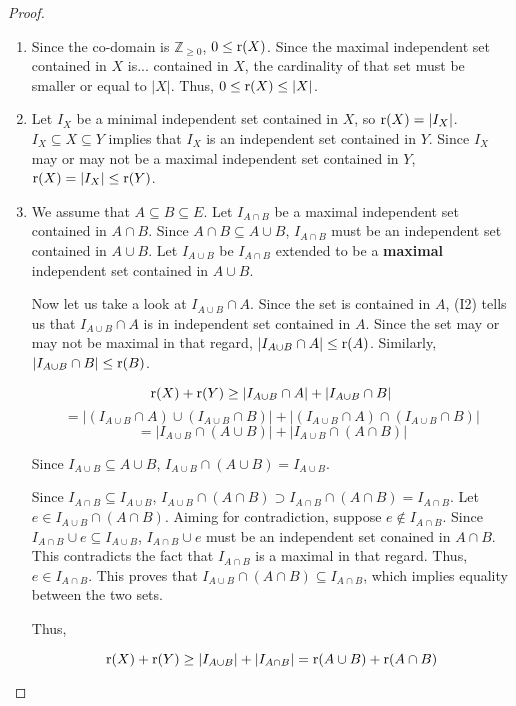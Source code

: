 \begin{proof}
    \,
    \begin{enumerate}
        \item Since the co-domain is $\mathbb{Z}_{\geq0}$, $0\leq\operatorname{r}(X)$. Since the maximal independent set contained in $X$ is... contained in $X$, the cardinality of that set must be smaller or equal to $|X|$. Thus, $0\leq\operatorname{r}(X)\leq|X|$.
        \item Let $I_X$ be a minimal independent set contained in $X$, so $\operatorname{r}(X)=|I_X|$. $I_X\subseteq X\subseteq Y$ implies that $I_X$ is an independent set contained in $Y$. Since $I_X$ may or may not be a maximal independent set contained in $Y$, $\operatorname{r}(X)=|I_X|\leq\operatorname{r}(Y)$. 
        \item We assume that $A\subseteq B\subseteq E$. Let $I_{A\cap B}$ be a maximal independent set contained in $A\cap B$. Since $A\cap B\subseteq A\cup B$, $I_{A\cap B}$ must be an independent set contained in $A\cup B$. Let $I_{A\cup B}$ be $I_{A\cap B}$ extended to be a \textbf{maximal} independent set contained in $A\cup B$. 
        
        Now let us take a look at $I_{A\cup B}\cap A$. Since the set is contained in $A$, (I2) tells us that $I_{A\cup B}\cap A$ is in independent set contained in $A$. Since the set may or may not be maximal in that regard, $|I_{A\cup B}\cap A|\leq \operatorname{r}(A)$. Similarly, $|I_{A\cup B}\cap B|\leq \operatorname{r}(B) $.
        
        $$ \operatorname{r}(X)+\operatorname{r}(Y) \geq |I_{A\cup B}\cap A|+|I_{A\cup B}\cap B| $$
        $$ = |(I_{A\cup B}\cap A)\cup(I_{A\cup B}\cap B)|+|(I_{A\cup B}\cap A)\cap(I_{A\cup B}\cap B)| $$
        $$ = |I_{A\cup B}\cap (A\cup B)|+|I_{A\cup B}\cap (A\cap B)| $$

        Since $I_{A\cup B}\subseteq A\cup B$, $I_{A\cup B}\cap(A\cup B) = I_{A\cup B}$.

        Since $I_{A\cap B}\subseteq I_{A\cup B}$, $I_{A\cup B}\cap (A\cap B) \supset I_{A\cap B}\cap (A\cap B) = I_{A\cap B} $. Let $e\in I_{A\cup B}\cap (A\cap B)$. Aiming for contradiction, suppose $e\notin I_{A\cap B}$. Since $I_{A\cap B}\cup e \subseteq I_{A\cup B} $, $I_{A\cap B}\cup e$ must be an independent set conained in $A\cap B$. This contradicts the fact that $I_{A\cap B}$ is a maximal in that regard. Thus, $e\in I_{A\cap B}$. This proves that $I_{A\cup B}\cap(A\cap B)\subseteq I_{A\cap B} $, which implies equality between the two sets.

        Thus,

        $$ \operatorname{r}(X)+\operatorname{r}(Y) \geq |I_{A\cup B}|+|I_{A\cap B}| = \operatorname{r}(A\cup B)+\operatorname{r}(A\cap B) $$
    \end{enumerate}
\end{proof}
